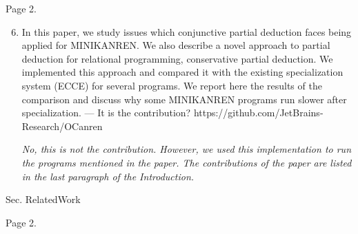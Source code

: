 Page 2.

\begin{enumerate}
  \setcounter{enumi}{5}
  \item In this paper, we study issues which conjunctive partial deduction faces being applied for MINIKANREN. We also describe a novel approach to partial deduction for relational programming, conservative partial deduction. We implemented this approach and compared it with the existing specialization system (ECCE) for several programs. We report here the results of the comparison and discuss why some MINIKANREN programs run slower after specialization.
  --- It is the contribution? https://github.com/JetBrains-Research/OCanren

  \emph{No, this is not the contribution. However, we used this \mk implementation to run the programs mentioned in the paper. The contributions of the paper are listed in the last paragraph of the Introduction.}
\end{enumerate}

Sec. RelatedWork

Page 2.

